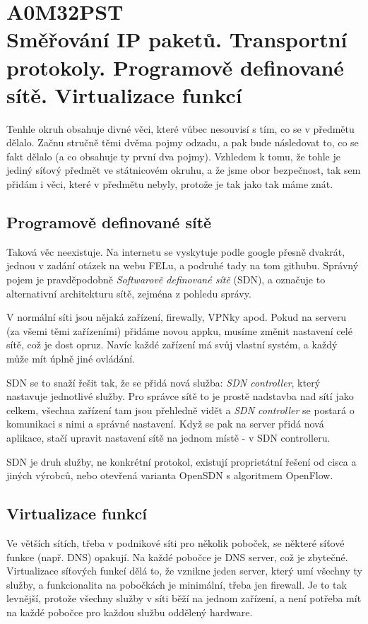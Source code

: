\chapter[Pokročilé síťové technologie]{A0M32PST \\[1ex]\Large{Směřování IP paketů. Transportní protokoly. Programově definované sítě. Virtualizace funkcí}}

Tenhle okruh obsahuje divné věci, které vůbec nesouvisí s tím, co se v předmětu dělalo. Začnu stručně těmi dvěma pojmy odzadu, a pak bude následovat to, co se fakt dělalo (a co obsahuje ty první dva pojmy). Vzhledem k tomu, že tohle je jediný síťový předmět ve státnicovém okruhu, a že jsme obor bezpečnost, tak sem přidám i věci, které v předmětu nebyly, protože je tak jako tak máme znát.

\section{Programově definované sítě}

Taková věc neexistuje. Na internetu se vyskytuje podle google přesně dvakrát, jednou v zadání otázek na webu FELu, a podruhé tady na tom githubu. Správný pojem je pravděpodobně \textit{Softwarově definované sítě} (SDN), a označuje to alternativní architekturu sítě, zejména z pohledu správy.

V normální síti jsou nějaká zařízení, firewally, VPNky apod. Pokud na serveru (za všemi těmi zařízeními) přidáme novou appku, musíme změnit nastavení celé sítě, což je dost opruz. Navíc každé zařízení má svůj vlastní systém, a každý může mít úplně jiné ovládání.

SDN se to snaží řešit tak, že se přidá nová služba: \textit{SDN controller}, který nastavuje jednotlivé služby. Pro správce sítě to je prostě nadstavba nad sítí jako celkem, všechna zařízení tam jsou přehledně vidět a \textit{SDN controller} se postará o komunikaci s nimi a správné nastavení. Když se pak na server přidá nová aplikace, stačí upravit nastavení sítě na jednom místě - v SDN controlleru.

SDN je druh služby, ne konkrétní protokol, existují proprietátní řešení od cisca a jiných výrobců, nebo otevřená varianta OpenSDN s algoritmem OpenFlow.

\section{Virtualizace funkcí}

Ve větších sítích, třeba v podnikové síti pro několik poboček, se některé síťové funkce (např. DNS) opakují. Na každé pobočce je DNS server, což je zbytečné. Virtualizace síťových funkcí dělá to, že vznikne jeden server, který umí všechny ty služby, a funkcionalita na pobočkách je minimální, třeba jen firewall. Je to tak levnější, protože všechny služby v síti běží na jednom zařízení, a není potřeba mít na každé pobočce pro každou službu oddělený hardware.

